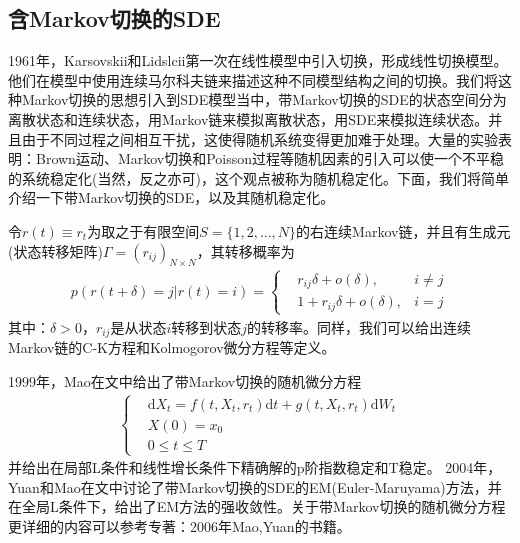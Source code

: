     \subsection{含Markov切换的SDE}
        \par
        1961年，Karsovskii和Lidslcii第一次在线性模型中引入切换，形成线性切换模型。他们在模型中使用连续马尔科夫链来描述这种不同模型结构之间的切换。我们将这种Markov切换的思想引入到SDE模型当中，带Markov切换的SDE的状态空间分为离散状态和连续状态，用Markov链来模拟离散状态，用SDE来模拟连续状态。并且由于不同过程之间相互干扰，这使得随机系统变得更加难于处理。大量的实验表明：Brown运动、Markov切换和Poisson过程等随机因素的引入可以使一个不平稳的系统稳定化(当然，反之亦可)，这个观点被称为随机稳定化。下面，我们将简单介绍一下带Markov切换的SDE，以及其随机稳定化。
        \par
        令$r(t) \equiv r_t$为取之于有限空间$S = \{1,2,\dots,N\}$的右连续Markov链，并且有生成元(状态转移矩阵)$\Gamma = (r_{ij})_{N \times N}$，其转移概率为
        \begin{align*}
            p(r(t+\delta) =j|r(t) = i) =
            \left\{
                \begin{aligned}
                &r_{ij}\delta +o(\delta),&i \neq j\\
                &1+r_{ij}\delta +o(\delta),&i = j
                \end{aligned}
            \right.
        \end{align*}
        其中：$\delta >0$，$r_{ij}$是从状态$i$转移到状态$j$的转移率。同样，我们可以给出连续Markov链的C-K方程和Kolmogorov微分方程等定义。
        \par
        1999年，Mao在文\cite{1999.Mao}中给出了带Markov切换的随机微分方程
        \begin{align*}
            \left\{
                \begin{aligned}
                &\mathrm{d}X_t = f(t,X_t,r_t)\mathrm{d}t + g(t,X_t,r_t)\mathrm{d}W_t\\
                &X(0) = x_0\\
                &0 \leqslant t \leqslant T
                \end{aligned}
            \right.
        \end{align*}
        并给出在局部L条件和线性增长条件下精确解的p阶指数稳定和T稳定。
        2004年，Yuan和Mao在文\cite{2004.Yuan}中讨论了带Markov切换的SDE的EM(Euler-Maruyama)方法，并在全局L条件下，给出了EM方法的强收敛性。关于带Markov切换的随机微分方程更详细的内容可以参考专著：2006年Mao,Yuan的书籍\cite{2006.Mao}。
